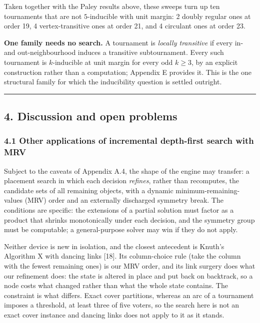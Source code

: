 \documentclass[
]{article}
\begin{document}
Taken together with the Paley results above, these sweeps turn up ten
tournaments that are not \(5\)-inducible with unit margin: 2 doubly
regular ones at order 19, 4 vertex-transitive ones at order 21, and 4
circulant ones at order 23.

\textbf{One family needs no search.} A tournament is \emph{locally
transitive} if every in- and out-neighbourhood induces a transitive
subtournament. Every such tournament is \(k\)-inducible at unit margin
for every odd \(k \geq 3\), by an explicit construction rather than a
computation; Appendix E provides it. This is the one structural family
for which the inducibility question is settled outright.

\begin{center}\rule{0.5\linewidth}{0.5pt}\end{center}

\subsection{4. Discussion and open
problems}\label{discussion-and-open-problems}

\subsubsection{4.1 Other applications of incremental depth-first search
with
MRV}\label{other-applications-of-incremental-depth-first-search-with-mrv}

Subject to the caveats of Appendix A.4, the shape of the engine may
transfer: a placement search in which each decision \emph{refines},
rather than recomputes, the candidate sets of all remaining objects,
with a dynamic minimum-remaining-values (MRV) order and an externally
discharged symmetry break. The conditions are specific: the extensions
of a partial solution must factor as a product that shrinks
monotonically under each decision, and the symmetry group must be
computable; a general-purpose solver may win if they do not apply.

Neither device is new in isolation, and the closest antecedent is
Knuth's Algorithm X with dancing links {[}18{]}. Its column-choice rule
(take the column with the fewest remaining ones) is our MRV order, and
its link surgery does what our refinement does: the state is altered in
place and put back on backtrack, so a node costs what changed rather
than what the whole state contains. The constraint is what differs.
Exact cover partitions, whereas an arc of a tournament imposes a
threshold, at least three of five voters, so the search here is not an
exact cover instance and dancing links does not apply to it as it
stands.
\end{document}
